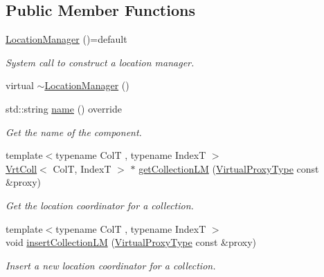 \subsection*{Public Member Functions}
\begin{DoxyCompactItemize}
\item 
\hyperlink{structvt_1_1location_1_1_location_manager_af5cf57c9ef31ccf5b207394cbd9363ee}{Location\+Manager} ()=default
\begin{DoxyCompactList}\small\item\em System call to construct a location manager. \end{DoxyCompactList}\item 
virtual \hyperlink{structvt_1_1location_1_1_location_manager_abdcd3feb1f6e7c22f88582ad87799de1}{$\sim$\+Location\+Manager} ()
\item 
std\+::string \hyperlink{structvt_1_1location_1_1_location_manager_afdb88906b8c4b5535f239d6581f840e0}{name} () override
\begin{DoxyCompactList}\small\item\em Get the name of the component. \end{DoxyCompactList}\item 
{\footnotesize template$<$typename ColT , typename IndexT $>$ }\\\hyperlink{structvt_1_1location_1_1_location_manager_a189fc3b436520c19aada9623a6b4a42e}{Vrt\+Coll}$<$ ColT, IndexT $>$ $\ast$ \hyperlink{structvt_1_1location_1_1_location_manager_a2d95ed25544679c16a84a173e84b92b6}{get\+Collection\+LM} (\hyperlink{namespacevt_a1b417dd5d684f045bb58a0ede70045ac}{Virtual\+Proxy\+Type} const \&proxy)
\begin{DoxyCompactList}\small\item\em Get the location coordinator for a collection. \end{DoxyCompactList}\item 
{\footnotesize template$<$typename ColT , typename IndexT $>$ }\\void \hyperlink{structvt_1_1location_1_1_location_manager_ae62f2826ad6bebc5dcad0d6ad13af365}{insert\+Collection\+LM} (\hyperlink{namespacevt_a1b417dd5d684f045bb58a0ede70045ac}{Virtual\+Proxy\+Type} const \&proxy)
\begin{DoxyCompactList}\small\item\em Insert a new location coordinator for a collection. \end{DoxyCompactList}\end{DoxyCompactItemize}
